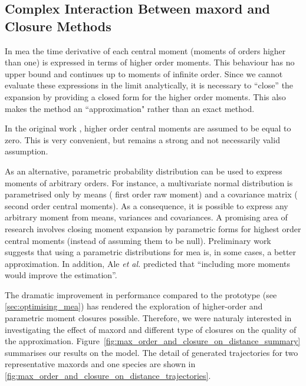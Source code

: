 
\subsection{Complex Interaction Between \Gls{maxord} and Closure Methods}
\label{sec:results:mea_performance}

In \gls{mea} the time derivative of each central moment (moments of orders higher than one) is expressed in terms of higher order moments.
This behaviour has no upper bound and continues up to moments of infinite order.
Since we cannot evaluate these expressions in the limit analytically, it is necessary to ``close'' the expansion by providing a closed form for the higher order moments.
This also makes the method an ``approximation" rather than an exact method.

In the original work \cite{ale_general_2013}, higher order central moments are assumed to be equal to zero.
This is very convenient, but remains a strong and not necessarily valid assumption.

As an alternative, parametric probability distribution can be used to express moments of arbitrary orders.
For instance, a multivariate normal distribution is parametrised only by means (\ie{} first order raw moment)
and a covariance matrix (\ie{} second order central moments).
As a consequence, it is possible to express any arbitrary moment from means, variances and covariances.
A promising area of research involves closing moment expansion by parametric forms for highest order central moments (instead of assuming them to be null).
Preliminary work \cite{lakatos_preparation_2014} suggests that using a parametric distributions for \gls{mea} is, in some cases, a better approximation.
In addition, Ale \emph{et al.} predicted that ``including more moments would improve the estimation''\cite{ale_general_2013}.

The dramatic improvement in performance compared to the \mat{} prototype (see \autoref{sec:optimising_mea}) has rendered the exploration of higher-order and parametric moment closures possible.
Therefore, we were naturaly interested in investigating the effect of \gls{maxord} and different type of closures on the quality of the approximation.
Figure~\ref{fig:max_order_and_closure_on_distance_summary} summarises our results on the \pft{} model. 
The detail of generated trajectories for two representative \gls{maxord}s and one species are shown in
\autoref{fig:max_order_and_closure_on_distance_trajectories}.

